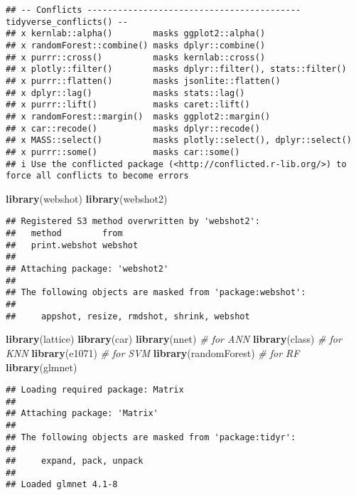 \documentclass[
]{article}
\newenvironment{Shaded}{\begin{snugshade}}{\end{snugshade}}
\newcommand{\CommentTok}[1]{\textcolor[rgb]{0.56,0.35,0.01}{\textit{#1}}}
\newcommand{\FunctionTok}[1]{\textcolor[rgb]{0.13,0.29,0.53}{\textbf{#1}}}
\newcommand{\NormalTok}[1]{#1}
\begin{document}
\begin{verbatim}
## -- Conflicts ------------------------------------------ tidyverse_conflicts() --
## x kernlab::alpha()        masks ggplot2::alpha()
## x randomForest::combine() masks dplyr::combine()
## x purrr::cross()          masks kernlab::cross()
## x plotly::filter()        masks dplyr::filter(), stats::filter()
## x purrr::flatten()        masks jsonlite::flatten()
## x dplyr::lag()            masks stats::lag()
## x purrr::lift()           masks caret::lift()
## x randomForest::margin()  masks ggplot2::margin()
## x car::recode()           masks dplyr::recode()
## x MASS::select()          masks plotly::select(), dplyr::select()
## x purrr::some()           masks car::some()
## i Use the conflicted package (<http://conflicted.r-lib.org/>) to force all conflicts to become errors
\end{verbatim}

\begin{Shaded}
\begin{Highlighting}[]
\FunctionTok{library}\NormalTok{(webshot)}
\FunctionTok{library}\NormalTok{(webshot2)}
\end{Highlighting}
\end{Shaded}

\begin{verbatim}
## Registered S3 method overwritten by 'webshot2':
##   method        from   
##   print.webshot webshot
## 
## Attaching package: 'webshot2'
## 
## The following objects are masked from 'package:webshot':
## 
##     appshot, resize, rmdshot, shrink, webshot
\end{verbatim}

\begin{Shaded}
\begin{Highlighting}[]
\FunctionTok{library}\NormalTok{(lattice)}
\FunctionTok{library}\NormalTok{(car)}
\FunctionTok{library}\NormalTok{(nnet) }\CommentTok{\# for ANN}
\FunctionTok{library}\NormalTok{(class) }\CommentTok{\# for KNN}
\FunctionTok{library}\NormalTok{(e1071) }\CommentTok{\# for SVM}
\FunctionTok{library}\NormalTok{(randomForest) }\CommentTok{\# for RF}
\FunctionTok{library}\NormalTok{(glmnet)}
\end{Highlighting}
\end{Shaded}

\begin{verbatim}
## Loading required package: Matrix
## 
## Attaching package: 'Matrix'
## 
## The following objects are masked from 'package:tidyr':
## 
##     expand, pack, unpack
## 
## Loaded glmnet 4.1-8
\end{verbatim}
\end{document}
